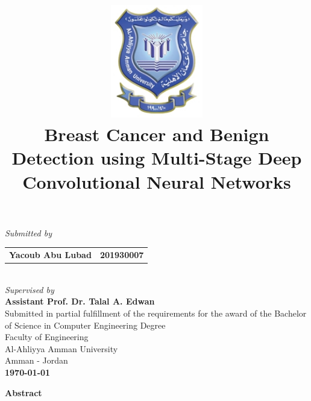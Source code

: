 \documentclass[12pt]{extarticle}
\title{\includegraphics[width=4cm]{pics/AAU_Logo.jpg}\\\Large{\textbf{Breast Cancer and Benign Detection using Multi-Stage Deep Convolutional Neural Networks}}
\date{}}
\begin{document}
	\clearpage\maketitle
	\begin{center}
		\vspace{-1.5cm}
		\large{\emph{Submitted by}}\\\vspace{0.5cm}
		\begin{tabular}{l l}
			
			\multicolumn{1}{p{6cm}}{ \large{\textbf{Yacoub Abu Lubad}}} &  \multicolumn{1}{p{6cm}}{\centering \large{\textbf{201930007}}} 
		\end{tabular}\\\vspace{1cm}
		\large{\emph{Supervised by}}\\\vspace{0.5cm}
		\large{\textbf{Assistant Prof. Dr. Talal A. Edwan}}\\\vspace{1cm}
		{Submitted in partial fulfillment of the requirements for the award of the Bachelor of Science in Computer Engineering Degree\\\vspace{1cm}
		Faculty of Engineering\\Al-Ahliyya Amman University\\Amman - Jordan}\\ \vspace{0.5cm}
		\Large{\textbf{\monthyeardate\today}}
		
		\thispagestyle{empty}
	\end{center}
	\newpage
	\setcounter{page}{1}
	\begin{center}
		\LARGE{\textbf{Abstract}}\\ \vspace{1cm}
	\end{center}
\end{document}
